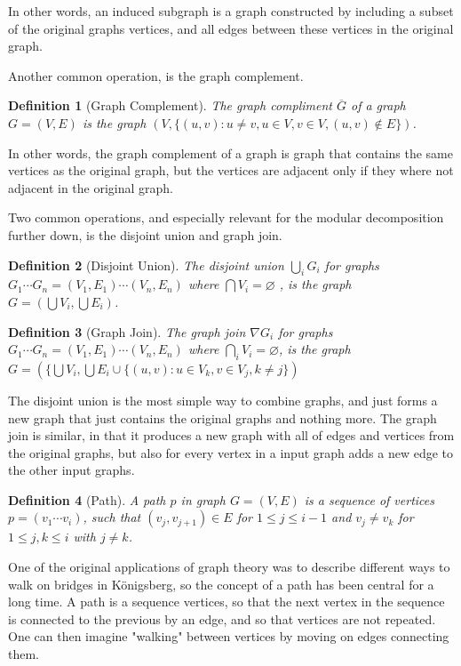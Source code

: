 \documentclass[a4paper]{article}
\newtheorem{definition}{Definition}[section]
\begin{document}
In other words, an induced subgraph is a graph constructed by including a
subset of the original graphs vertices, and all edges between these vertices in
the original graph.

Another common operation, is the graph complement.
\begin{definition}[Graph Complement]
    The graph compliment $\overline{G}$ of a graph $G = (V,E)$ is the graph 
    $(V,\{ (u,v) : u \neq v, u \in V,v \in V, (u,v) \notin E \})$.
\end{definition}

In other words, the graph complement of a
graph is graph that contains the same vertices as the original graph, but the
vertices are adjacent only if they where not adjacent in the original graph.

Two common operations, and especially relevant for the modular decomposition
further down, is the disjoint union and graph join.
\begin{definition}[Disjoint Union]
    The disjoint union $\bigcup_i G_i$ for graphs 
    $G_1 \cdots G_n = (V_1,E_1) \cdots (V_n,E_n)$ where 
    $\bigcap V_i = \varnothing $ , is the graph
    $G = \left( \bigcup V_i,\bigcup E_i \right)$.
\end{definition}

\begin{definition}[Graph Join]
    The graph join $\nabla G_i$ for graphs $G_1 \cdots G_n = (V_1,E_1) \cdots (V_n,E_n)$ where 
    $\bigcap_i V_i = \varnothing$, is the graph $G = (\{\bigcup V_i,
    \bigcup E_i \cup \{(u,v) : u \in V_k, v \in V_j, k \neq j \})$
\end{definition}

 The disjoint union is the
most simple way to combine graphs, and just forms a new graph that just
contains the original graphs and nothing more.  The graph join is similar, in
that it produces a new graph with all of edges and vertices from the original
graphs, but also for every vertex in a input graph adds a new edge to the other
input graphs.



\begin{definition}[Path]
    A path $p$ in graph $G = (V,E)$ is a sequence of vertices $p = (v_1\cdots
    v_i)$, such that $(v_j,v_{j+1}) \in E$ for $1 \leq j \leq i-1$ and $v_j \neq v_k$ 
    for $1 \leq j,k \leq i$ with $j \neq k$.
\end{definition}

One of the original applications of graph theory was to describe different ways
to walk on bridges in Königsberg, so the concept of a path has been central for
a long time.  A path is a sequence vertices, so that the next vertex in the
sequence is connected to the previous by an edge, and so that vertices are not
repeated.  One can then imagine "walking" between vertices by moving on edges
connecting them.  
\end{document}
